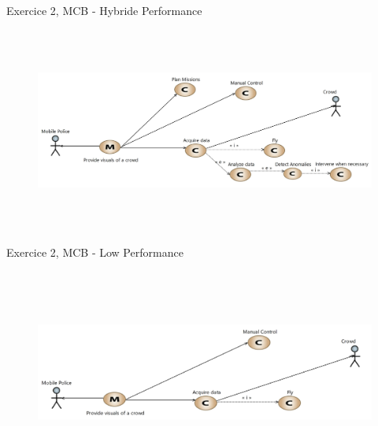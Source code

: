 \documentclass[aspectratio=1610]{beamer}
\begin{document}
    \begin{frame}{Exercice 2, MCB - Hybride Performance}
        \begin{figure}[H]
            \centering
            \includegraphics[width=\textwidth, height=6.75cm, keepaspectratio]{./images/EX2/CSC_5RO08_TA_EX2_MCB_Hybride.jpg}
        \end{figure}
    \end{frame}
    \begin{frame}{Exercice 2, MCB - Low Performance}
        \begin{figure}[H]
            \centering
            \includegraphics[width=\textwidth, height=6.75cm, keepaspectratio]{./images/EX2/CSC_5RO08_TA_EX2_MCB_Low.jpg}
        \end{figure}
    \end{frame}
\end{document}
